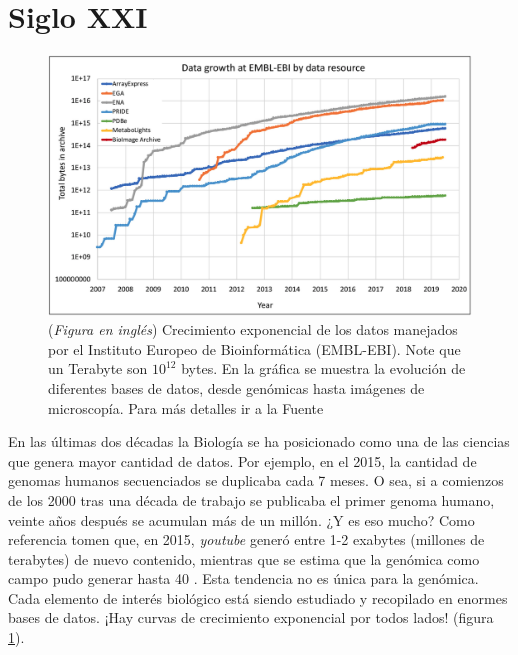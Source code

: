 \section{Siglo XXI}

\begin{figure}[tb]
  \centering
  \includegraphics[width=0.9\columnwidth]{images/Dat_trend.png}
  \caption{
      (\textit{Figura en inglés})
      Crecimiento exponencial de los datos manejados por el Instituto Europeo de Bioinformática (EMBL-EBI).
      Note que un Terabyte son $10^{12}$ bytes.
      En la gráfica se muestra la evolución de diferentes bases de datos, desde genómicas hasta imágenes de microscopía.
      Para más detalles ir a la Fuente \cite{cookEuropeanBioinformaticsInstitute2020}
  }
  \label{fig:Dat_trend}
\end{figure}

En las últimas dos décadas la Biología se ha posicionado como una de las ciencias que genera mayor cantidad de datos.
Por ejemplo, en el 2015, la cantidad de genomas humanos secuenciados se duplicaba cada 7 meses.
O sea, si a comienzos de los 2000 tras una década de trabajo se publicaba el primer genoma humano, veinte años después se acumulan más de un millón.
¿Y es eso mucho?
Como referencia tomen que, en 2015, \textit{youtube} generó entre 1-2 exabytes (millones de terabytes) de nuevo contenido, mientras que se estima que la genómica como campo pudo generar hasta 40 \cite{stephensBigDataAstronomical2015}.
Esta tendencia no es única para la genómica.
Cada elemento de interés biológico está siendo estudiado y recopilado en enormes bases de datos.
¡Hay curvas de crecimiento exponencial por todos lados! (figura \ref{fig:Dat_trend}).

